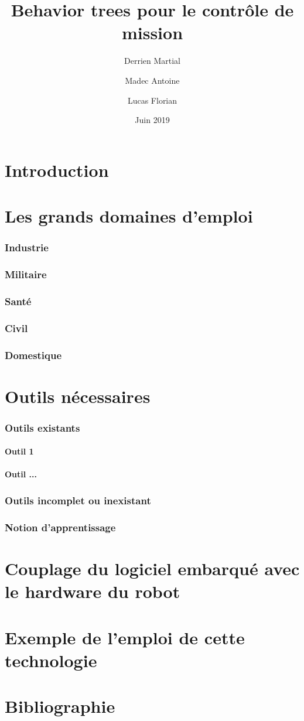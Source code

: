 \documentclass[titlepage]{article}
\title{Behavior trees pour le contr\^ole de mission}
\author{
	Derrien Martial \\
	\and
	Madec Antoine \\
	\and
	Lucas Florian
}
\date{Juin 2019}
\begin{document}
	\maketitle
	\tableofcontents
	\hypersetup{linktocpage}
	\part{Introduction}
	\part{Les grands domaines d'emploi}
		\section{Industrie}
		\section{Militaire}
		\section{Sant\'e}
		\section{Civil}
		\section{Domestique}
	\part{Outils n\'ecessaires}
		\section{Outils existants}
			\subsection{Outil 1}
			\subsection{Outil ...}
		\section{Outils incomplet ou inexistant}
		\section{Notion d'apprentissage}
	\part{Couplage du logiciel embarqu\'e avec le hardware du robot}
	\part{Exemple de l'emploi de cette technologie}
	\part{Bibliographie}
\end{document}
